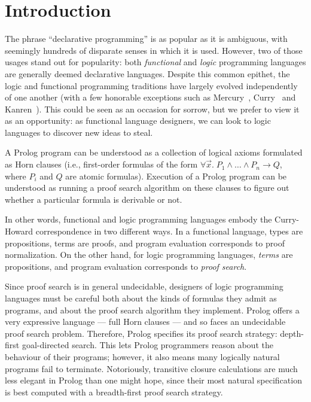 \section{Introduction}

The phrase ``declarative programming'' is as popular as it is
ambiguous, with seemingly hundreds of disparate senses in which it is
used. However, two of those usages stand out for popularity: both
\emph{functional} and \emph{logic} programming languages are generally
deemed declarative languages. Despite this common epithet, the logic
and functional programming traditions have largely evolved
independently of one another (with a few honorable exceptions such as
Mercury~\cite{mercury}, Curry~\cite{curry} and
Kanren~\cite{kanren}). This could be seen as an occasion for sorrow,
but we prefer to view it as an opportunity: as functional language
designers, we can look to logic languages to discover new ideas to
steal.

A Prolog program can be understood as a collection of logical axioms
formulated as Horn clauses (i.e., first-order formulas of the form
$\forall \vec{x}.\;P_1 \land \ldots \land P_n \to Q$, where $P_i$ and
$Q$ are atomic formulas).  Execution of a Prolog program can be
understood as running a proof search algorithm on these clauses to
figure out whether a particular formula is derivable or not.

In other words, functional and logic programming languages embody the
Curry-Howard correspondence in two different ways. In a functional
language, types are propositions, terms are proofs, and program
evaluation corresponds to proof normalization. On the other hand, for
logic programming languages, \emph{terms} are propositions, and
program evaluation corresponds to \emph{proof search}.

Since proof search is in general undecidable, designers of logic
programming languages must be careful both about the kinds of formulas
they admit as programs, and about the proof search algorithm they
implement. Prolog offers a very expressive language --- full Horn
clauses --- and so faces an undecidable proof search problem.
Therefore, Prolog specifies its proof search strategy: depth-first
goal-directed search. This lets Prolog programmers reason about the
behaviour of their programs; however, it also means many logically
natural programs fail to terminate. Notoriously, transitive closure
calculations are much less elegant in Prolog than one might hope,
since their most natural specification is best computed with a
breadth-first proof search strategy.


